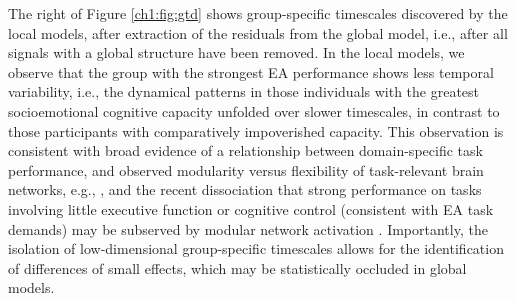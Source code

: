 The right of Figure \ref{ch1:fig:gtd} shows group-specific timescales discovered by the local models, after extraction of the residuals from the global model, i.e., after all signals with a global structure have been removed. In the local models, we observe that the group with the strongest EA performance shows less temporal variability, i.e., the dynamical patterns in those individuals with the greatest socioemotional cognitive capacity unfolded over slower timescales, in contrast to those participants with comparatively impoverished capacity. This observation is consistent with broad evidence of a relationship between domain-specific task performance, and observed modularity versus flexibility of task-relevant brain networks, e.g., \cite{olsen2013functional}, and the recent dissociation that strong performance on tasks involving little executive function or cognitive control (consistent with EA task demands) may be subserved by modular network activation \cite{ramos2017static}. Importantly, the isolation of low-dimensional group-specific timescales allows for the identification of differences of small effects, which may be statistically occluded in global models. 




